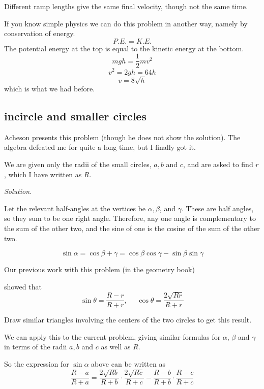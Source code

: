 \documentclass[11pt, oneside]{article}
\begin{document}
Different ramp lengths give the same final velocity, though not the same time.

If you know simple physics we can do this problem in another way, namely by conservation of energy.
\[ P.E. = K.E. \]
The potential energy at the top is equal to the kinetic energy at the bottom.
\[ mgh = \frac{1}{2} mv^2 \]
\[ v^2 = 2gh = 64 h \]
\[ v =  8 \sqrt{h} \]
which is what we had before.

\subsection*{incircle and smaller circles}

Acheson presents this problem (though he does not show the solution).  The algebra defeated me for quite a long time, but I finally got it.

We are given only the radii of the small circles, $a,b$ and $c$, and are asked to find $r$, which I have written as $R$.


\emph{Solution}.

Let the relevant half-angles at the vertices be $\alpha, \beta$, and $\gamma$.  These are half angles, so they sum to be one right angle.  Therefore, any one angle is complementary to the sum of the other two, and the sine of one is the cosine of the sum of the other two. 

\[ \sin \alpha = \cos \beta + \gamma = \cos \beta \cos \gamma - \sin \beta \sin \gamma \]

Our previous work with this problem (in the geometry book)

showed that 
\[ \sin \theta = \frac{R - r}{R + r}, \ \ \ \ \ \ \cos \theta = \frac{2\sqrt{Rr}}{R + r} \]

Draw similar triangles involving the centers of the two circles to get this result.

We can apply this to the current problem, giving similar formulas for $\alpha$, $\beta$ and $\gamma$ in terms of the radii $a, b$ and $c$ as well as $R$.

So the expression for $\sin \alpha$ above can be written as 
\[ \frac{R - a}{R + a} = \frac{2\sqrt{Rb}}{R + b} \cdot \frac{2\sqrt{Rc}}{R + c} - \frac{R - b}{R + b} \cdot \frac{R - c}{R + c} \]
\end{document}
